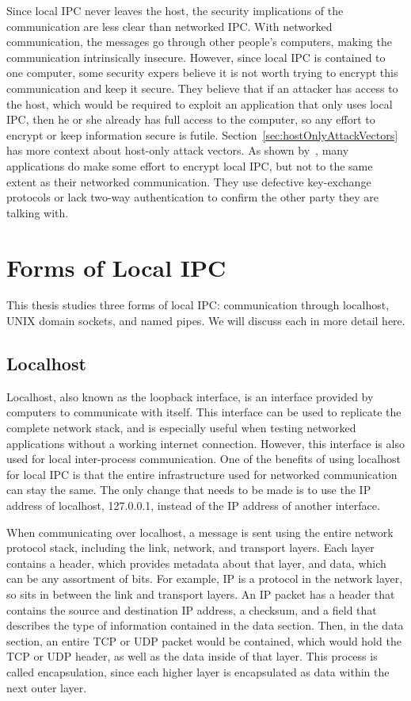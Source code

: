 Since local IPC never leaves the host, the security implications of the communication are less clear than networked IPC.  With networked communication, the messages go through other people's computers, making the communication intrinsically insecure.  However, since local IPC is contained to one computer, some security expers believe it is not worth trying to encrypt this communication and keep it secure.  They believe that if an attacker has access to the host, which would be required to exploit an application that only uses local IPC, then he or she already has full access to the computer, so any effort to encrypt or keep information secure is futile.  Section~\ref{sec:hostOnlyAttackVectors} has more context about host-only attack vectors.  As shown by~\cite{MitMa}, many applications do make some effort to encrypt local IPC, but not to the same extent as their networked communication.  They use defective key-exchange protocols or lack two-way authentication to confirm the other party they are talking with.

\section{Forms of Local IPC}
\label{sec:formsOfLocalIPC}
This thesis studies three forms of local IPC: communication through localhost, UNIX domain sockets, and named pipes.  We will discuss each in more detail here.

\subsection{Localhost}
\label{sec:localhost}
Localhost, also known as the loopback interface, is an interface provided by computers to communicate with itself.  This interface can be used to replicate the complete network stack, and is especially useful when testing networked applications without a working internet connection.  However, this interface is also used for local inter-process communication.  One of the benefits of using localhost for local IPC is that the entire infrastructure used for networked communication can stay the same.  The only change that needs to be made is to use the IP address of localhost, 127.0.0.1, instead of the IP address of another interface.

When communicating over localhost, a message is sent using the entire network protocol stack, including the link, network, and transport layers.  Each layer contains a header, which provides metadata about that layer, and data, which can be any assortment of bits.  For example, IP is a protocol in the network layer, so sits in between the link and transport layers.  An IP packet has a header that contains the source and destination IP address, a checksum, and a field that describes the type of information contained in the data section.  Then, in the data section, an entire TCP or UDP packet would be contained, which would hold the TCP or UDP header, as well as the data inside of that layer.  This process is called encapsulation, since each higher layer is encapsulated as data within the next outer layer.

